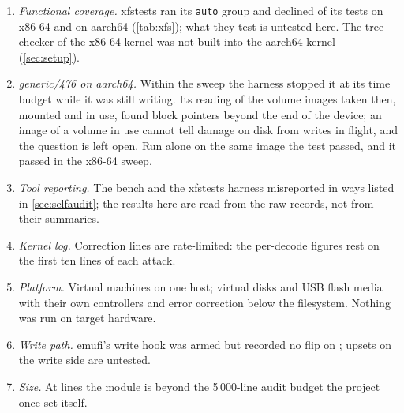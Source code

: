 \begin{enumerate}
  part of the cluster was not exercised (\cref{sec:setup}).
\item \emph{Functional coverage.} xfstests ran its \texttt{auto} group
  and declined \xfsXNotrun{} of its \xfsTotal{} tests on x86-64 and
  \xfsANotrun{} on aarch64 (\cref{tab:xfs}); what they test is untested
  here. The tree checker of the x86-64 kernel was not built into the
  aarch64 kernel (\cref{sec:setup}).
\item \emph{generic/476 on aarch64.} Within the sweep the harness
  stopped it at its time budget while it was still writing. Its reading
  of the volume images taken then, mounted and in use, found block
  pointers beyond the end of the device; an image of a volume in use
  cannot tell damage on disk from writes in flight, and the question is
  left open. Run alone on the same image the test passed, and it passed
  in the x86-64 sweep.
\item \emph{Tool reporting.} The bench and the xfstests harness
  misreported in ways listed in \cref{sec:selfaudit}; the results here
  are read from the raw records, not from their summaries.
\item \emph{Kernel log.} Correction lines are rate-limited: the
  per-decode figures rest on the first ten lines of each attack.
\item \emph{Platform.} Virtual machines on one host; virtual disks and
  USB flash media with their own controllers and error correction
  below the filesystem. Nothing was run on target hardware.
\item \emph{Write path.} emufi's write hook was armed but recorded no
  flip on \bfs; upsets on the write side are untested.
\item \emph{Size.} At \moduleLines{} lines the module is beyond the
  5\,000-line audit budget the project once set itself.
\end{enumerate}
